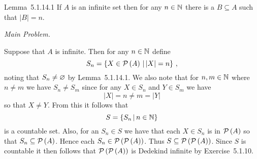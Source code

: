 
\begin{solution}
    \begin{statement}{Lemma~5.1.14.1}
        If $A$ is an infinite set then for any $n \in \mathbb{N}$ there is a $B \subseteq A$ such that $|B| = n$.
    \end{statement}


    \emph{Main Problem.}
    
    Suppose that $A$ is infinite.
    Then for any $n \in \mathbb{N}$ define
    $$
    S_n = \left\{ X \in \mathcal{P}\left(A\right) \,|\, |X| = n \right\} \,,
    $$
    noting that $S_n \neq \varnothing$ by Lemma~5.1.14.1.
    We also note that for $n,m \in \mathbb{N}$ where $n \neq m$ we have $S_n \neq S_m$ since for any $X \in S_n$ and $Y \in S_m$ we have
    $$
    |X| = n \neq m = |Y|
    $$
    so that $X \neq Y$.
    From this it follows that
    $$
    S = \left\{ S_n \,|\, n \in \mathbb{N} \right\}
    $$
    is a countable set.
    Also, for an $S_n \in S$ we have that each $X \in S_n$ is in $\mathcal{P}\left(A\right)$ so that $S_n \subseteq \mathcal{P}\left(A\right)$.
    Hence each $S_n \in \mathcal{P}\left(\mathcal{P}\left(A\right)\right)$.
    Thus $S \subseteq \mathcal{P}\left(\mathcal{P}\left(A\right)\right)$.
    Since $S$ is countable it then follows that $\mathcal{P}\left(\mathcal{P}\left(A\right)\right)$ is Dedekind infinite by Exercise~5.1.10.
\end{solution}


